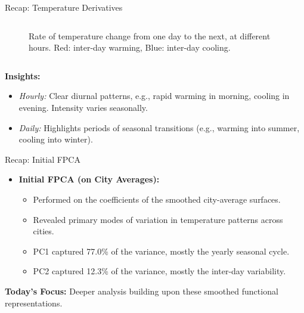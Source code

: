 \documentclass[svgnames, 12pt]{beamer}
\begin{document}
\begin{frame}{Recap: Temperature Derivatives}
\begin{columns}[T]
\begin{column}{0.5\textwidth}
\begin{figure}
        \caption*{Rate of temperature change from one day to the next, at different hours. Red: inter-day warming, Blue: inter-day cooling.}
      \end{figure}
    \end{column}
  \end{columns}
  \vspace{0.5em} %
  \textbf{Insights:}
  \begin{itemize}
    \item \textit{Hourly:} Clear diurnal patterns, e.g., rapid warming in morning, cooling in evening. Intensity varies seasonally.
    \item \textit{Daily:} Highlights periods of seasonal transitions (e.g., warming into summer, cooling into winter).
  \end{itemize}
\end{frame}

\begin{frame}{Recap: Initial FPCA}
  \begin{itemize}
    \item \textbf{Initial FPCA (on City Averages):}
        \begin{itemize}
            \item Performed on the coefficients of the smoothed city-average surfaces.
            \item Revealed primary modes of variation in temperature patterns across cities.
            \item PC1 captured 77.0\% of the variance, mostly the yearly seasonal cycle.
            \item PC2 captured 12.3\% of the variance, mostly the inter-day variability.
        \end{itemize}
  \end{itemize}
  \textbf{Today's Focus:} Deeper analysis building upon these smoothed functional representations.
\end{frame}

\end{document}
